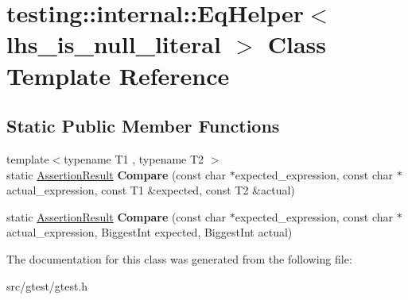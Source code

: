 \hypertarget{classtesting_1_1internal_1_1_eq_helper}{}\section{testing\+:\+:internal\+:\+:Eq\+Helper$<$ lhs\+\_\+is\+\_\+null\+\_\+literal $>$ Class Template Reference}
\label{classtesting_1_1internal_1_1_eq_helper}
\subsection*{Static Public Member Functions}
\begin{DoxyCompactItemize}
\item 
\mbox{\label{classtesting_1_1internal_1_1_eq_helper_ac2977ed90cd3c88607f804e43b86b92c}} 
{\footnotesize template$<$typename T1 , typename T2 $>$ }\\static \mbox{\hyperlink{classtesting_1_1_assertion_result}{Assertion\+Result}} {\bfseries Compare} (const char $\ast$expected\+\_\+expression, const char $\ast$actual\+\_\+expression, const T1 \&expected, const T2 \&actual)
\item 
\mbox{\label{classtesting_1_1internal_1_1_eq_helper_a3de996954b41d484c065ed824fe7eac9}} 
static \mbox{\hyperlink{classtesting_1_1_assertion_result}{Assertion\+Result}} {\bfseries Compare} (const char $\ast$expected\+\_\+expression, const char $\ast$actual\+\_\+expression, Biggest\+Int expected, Biggest\+Int actual)
\end{DoxyCompactItemize}


The documentation for this class was generated from the following file\+:\begin{DoxyCompactItemize}
\item 
src/gtest/gtest.\+h\end{DoxyCompactItemize}
